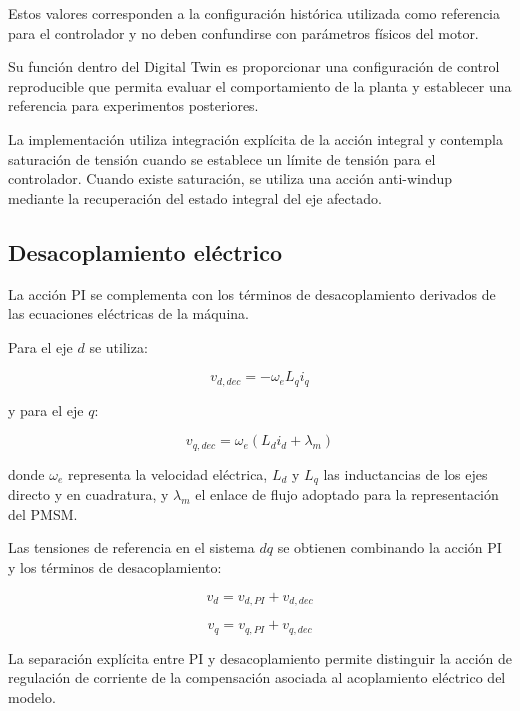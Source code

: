 Estos valores corresponden a la configuración histórica utilizada como referencia para el controlador y no deben confundirse con parámetros físicos del motor.

Su función dentro del Digital Twin es proporcionar una configuración de control reproducible que permita evaluar el comportamiento de la planta y establecer una referencia para experimentos posteriores.

La implementación utiliza integración explícita de la acción integral y contempla saturación de tensión cuando se establece un límite de tensión para el controlador. Cuando existe saturación, se utiliza una acción anti-windup mediante la recuperación del estado integral del eje afectado.

\subsection{Desacoplamiento eléctrico}

La acción PI se complementa con los términos de desacoplamiento derivados de las ecuaciones eléctricas de la máquina.

Para el eje $d$ se utiliza:

\begin{equation}
v_{d,dec}=-\omega_e L_q i_q
\end{equation}

y para el eje $q$:

\begin{equation}
v_{q,dec}=\omega_e\left(L_d i_d+\lambda_m\right)
\end{equation}

donde $\omega_e$ representa la velocidad eléctrica, $L_d$ y $L_q$ las inductancias de los ejes directo y en cuadratura, y $\lambda_m$ el enlace de flujo adoptado para la representación del PMSM.

Las tensiones de referencia en el sistema $dq$ se obtienen combinando la acción PI y los términos de desacoplamiento:

\begin{equation}
v_d=v_{d,PI}+v_{d,dec}
\end{equation}

\begin{equation}
v_q=v_{q,PI}+v_{q,dec}
\end{equation}

La separación explícita entre PI y desacoplamiento permite distinguir la acción de regulación de corriente de la compensación asociada al acoplamiento eléctrico del modelo.

